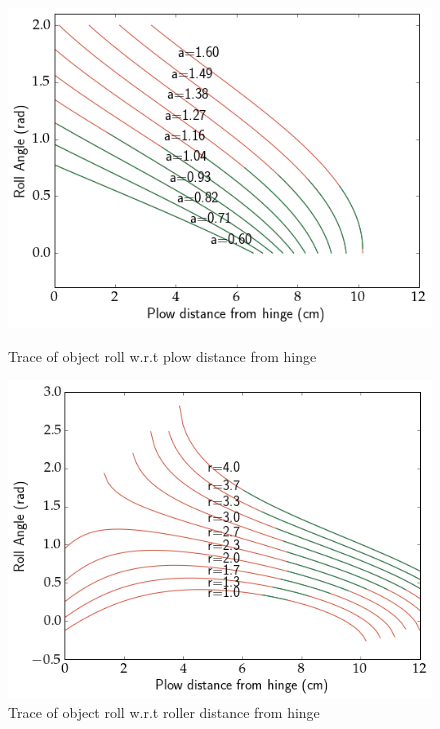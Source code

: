 \documentclass[runningheads,a4paper]{llncs}
\begin{document}
\begin{figure}[!ht]
  \centering
  \begin{minipage}[b]{0.4\textwidth}
    \includegraphics[width=1.0\textwidth]{PlowFlipTrace.png}
    \caption{\label{fig:plow}Trace of object roll w.r.t plow distance from hinge}
  \end{minipage}
  \hfill
  \begin{minipage}[b]{0.4\textwidth}
    \includegraphics[width=1.0\textwidth]{RollerFlipTrace.png}
    \caption{\label{fig:roller}Trace of object roll w.r.t roller distance from hinge}
  \end{minipage}
\end{figure}
\end{document}
